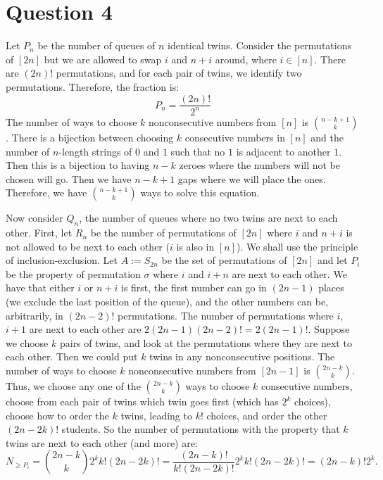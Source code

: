 \documentclass[]{article}
\begin{document}
\section{Question 4}
Let $P_n$ be the number of queues of $n$ identical twins. Consider the permutations of $[2n]$ but we are allowed to swap $i$ and $n + i$ around, where $i \in [n]$. There are $(2n)!$ permutations, and for each pair of twins, we identify two permutations. Therefore, the fraction is:
\begin{equation}
	P_n = \frac{(2n)!}{2^n}
\end{equation}
The number of ways to choose $k$ nonconsecutive numbers from $[n]$ is $\binom{n - k + 1}{k}$. There is a bijection between choosing $k$ consecutive numbers in $[n]$ and the number of $n$-length strings of $0$ and $1$ such that no $1$ is adjacent to another $1$. Then this is a bijection to having $n-k$ zeroes where the numbers will not be chosen will go. Then we have $n - k + 1$ gaps where we will place the ones. Therefore, we have $\binom{n - k + 1}{k}$ ways to solve this equation. 
\par
Now consider $Q_n$, the number of queues where no two twins are next to each other. First, let $R_n$ be the number of permutations of $[2n]$ where $i$ and $n + i$ is not allowed to be next to each other ($i$ is also in $[n]$). We shall use the principle of inclusion-exclusion. Let $A := S_{2n}$ be the set of permutations of $[2n]$ and let $P_{i}$ be the property of permutation $\sigma$ where $i$ and $i + n$ are next to each other. We have that either $i$ or $n + i$ is first, the first number can go in $(2n - 1)$ places (we exclude the last position of the queue), and the other numbers can be, arbitrarily, in $(2n - 2)!$ permutations. The number of permutations where $i$, $i + 1$ are next to each other are $2(2n - 1) (2n - 2)! = 2 (2n - 1)!$. Suppose we choose $k$ pairs of twins, and look at the permutations where they are next to each other. Then we could put $k$ twins in any nonconsecutive positions. The number of ways to choose $k$ nonconsecutive numbers from $[2n-1]$ is $\binom{2n - k}{k}$. Thus, we choose any one of the $\binom{2n - k}{k}$ ways to choose $k$ consecutive numbers, choose from each pair of twins which twin goes first (which has $2^k$ choices), choose how to order the $k$ twins, leading to $k!$ choices, and order the other $(2n - 2k)!$ students. So the number of permutations with the property that $k$ twins are next to each other (and more) are:
\begin{equation}
	N_{\geq P_i} = \binom{2n - k}{k} 2^k k! (2n - 2k)! =  \frac{(2n - k)!}{k! (2n - 2k)!}2^k k! (2n - 2k)! = (2n - k)!2^k.
\end{equation}
\end{document}
